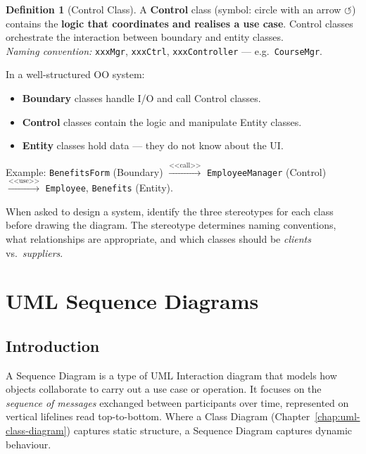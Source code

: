 \documentclass[11pt, a4paper, notitlepage]{report}
\theoremstyle{definition}
\newtheorem{definition}[theorem]{Definition}
\theoremstyle{remark}
\theoremstyle{definition}
\begin{document}
\begin{definition}[Control Class]
\label{def:ch6-control}
A \textbf{Control} class (symbol: circle with an arrow $\circlearrowleft$)
contains the \textbf{logic that coordinates and realises a use case}.  Control
classes orchestrate the interaction between boundary and entity classes.\\
\textit{Naming convention:} \texttt{xxxMgr}, \texttt{xxxCtrl},
\texttt{xxxController} --- e.g.\ \texttt{CourseMgr}.
\end{definition}

\begin{keyresult}[title={Key Result: Entity--Boundary--Control (EBC) Pattern}]
  In a well-structured OO system:
  \begin{itemize}[noitemsep]
    \item \textbf{Boundary} classes handle I/O and call Control classes.
    \item \textbf{Control} classes contain the logic and manipulate Entity
          classes.
    \item \textbf{Entity} classes hold data --- they do not know about the UI.
  \end{itemize}
  Example: \texttt{BenefitsForm} (Boundary)
  $\xrightarrow{\text{<<call>>}}$ \texttt{EmployeeManager} (Control)
  $\xrightarrow{\text{<<use>>}}$ \texttt{Employee}, \texttt{Benefits}
  (Entity).
\end{keyresult}

\begin{examtip}[title={Exam Tip: Using Stereotypes in Design Questions}]
  When asked to design a system, identify the three stereotypes for each class
  before drawing the diagram.  The stereotype determines naming conventions,
  what relationships are appropriate, and which classes should be
  \emph{clients} vs.\ \emph{suppliers}.
\end{examtip}

\chapter{UML Sequence Diagrams}
\label{chap:sequence-diagrams}

\section{Introduction}
\label{sec:ch7-intro}

A Sequence Diagram is a type of UML Interaction diagram that models how objects
collaborate to carry out a use case or operation. It focuses on the \emph{sequence
of messages} exchanged between participants over time, represented on vertical
lifelines read top-to-bottom. Where a Class Diagram (Chapter~\ref{chap:uml-class-diagram})
captures static structure, a Sequence Diagram captures dynamic behaviour.
\end{document}
